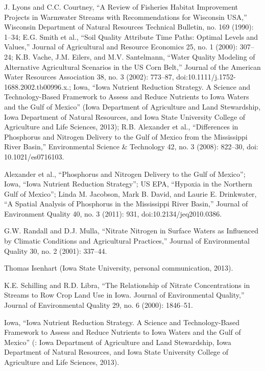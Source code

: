 \documentclass[11pt]{article}
\begin{document}
\begin{itemize}
\begin{thebibliography}{1}
     J. Lyons and C.C. Courtney, “A Review of Fisheries Habitat Improvement Projects in Warmwater Streams with Recommendations for Wisconsin USA,” Wisconsin Department of Natural Resources Technical Bulletin, no. 169 (1990): 1–34; E.G. Smith et al., “Soil Quality Attribute Time Paths: Optimal Levels and Values,” Journal of Agricultural and Resource Economics 25, no. 1 (2000): 307–24; K.B. Vache, J.M. Eilers, and M.V. Santelmann, “Water Quality Modeling of Alternative Agricultural Scenarios in the US Corn Belt,” Journal of the American Water Resources Association 38, no. 3 (2002): 773–87, doi:10.1111/j.1752-1688.2002.tb00996.x.; Iowa, “Iowa Nutrient Reduction Strategy. A Science and Technology-Based Framework to Assess and Reduce Nutrients to Iowa Waters and the Gulf of Mexico” (Iowa Department of Agriculture and Land Stewardship, Iowa Department of Natural Resources, and Iowa State University College of Agriculture and Life Sciences, 2013); R.B. Alexander et al., “Differences in Phosphorus and Nitrogen Delivery to the Gulf of Mexico from the Mississippi River Basin,” Environmental Science & Technology 42, no. 3 (2008): 822–30, doi: 10.1021/es0716103.
  
    Alexander et al., “Phosphorus and Nitrogen Delivery to the Gulf of Mexico”; Iowa, “Iowa Nutrient Reduction Strategy”; US EPA, “Hypoxia in the Northern Gulf of Mexico”; Linda M. Jacobson, Mark B. David, and Laurie E. Drinkwater, “A Spatial Analysis of Phosphorus in the Mississippi River Basin,” Journal of Environment Quality 40, no. 3 (2011): 931, doi:10.2134/jeq2010.0386.
  
   G.W. Randall and D.J. Mulla, “Nitrate Nitrogen in Surface Waters as Influenced by Climatic Conditions and Agricultural Practices,” Journal of Environmental Quality 30, no. 2 (2001): 337–44.
  
   Thomas Isenhart (Iowa State University, personal communication, 2013).
  
   K.E. Schilling and R.D. Libra, “The Relationship of Nitrate Concentrations in Streams to Row Crop Land Use in Iowa. Journal of Environmental Quality,” Journal of Environmental Quality 29, no. 6 (2000): 1846–51.
  
  Iowa, “Iowa Nutrient Reduction Strategy. A Science and Technology-Based Framework to Assess and Reduce Nutrients to Iowa Waters and the Gulf of Mexico” (: Iowa Department of Agriculture and Land Stewardship, Iowa Department of Natural Resources, and Iowa State University College of Agriculture and Life Sciences, 2013).
  

\end{thebibliography}
\end{itemize}
\end{document}
